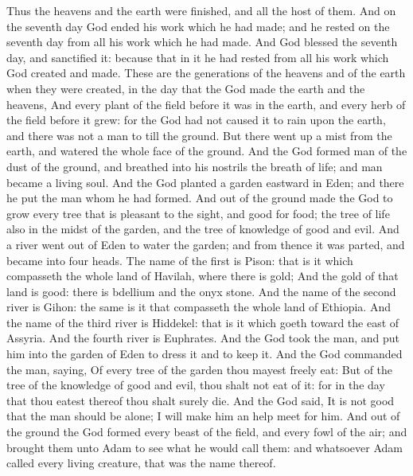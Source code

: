 \begin{biblechapter} %
\verse Thus the heavens and the earth were finished, and all the host of them.
\verse And on the seventh day God ended his work which he had made; and he rested on the seventh day from all his work which he had made.
\verse And God blessed the seventh day, and sanctified it: because that in it he had rested from all his work which God created and made.
 These are the generations of the heavens and of the earth when they were created, in the day that the \LORD God made the earth and the heavens,
\verse And every plant of the field before it was in the earth, and every herb of the field before it grew: for the \LORD God had not caused it to rain upon the earth, and there was not a man to till the ground.
\verse But there went up a mist from the earth, and watered the whole face of the ground.
\verse And the \LORD God formed man of the dust of the ground, and breathed into his nostrils the breath of life; and man became a living soul.
\verse And the \LORD God planted a garden eastward in Eden; and there he put the man whom he had formed.
\verse And out of the ground made the \LORD God to grow every tree that is pleasant to the sight, and good for food; the tree of life also in the midst of the garden, and the tree of knowledge of good and evil.
\verse And a river went out of Eden to water the garden; and from thence it was parted, and became into four heads.
\verse The name of the first is Pison: that is it which compasseth the whole land of Havilah, where there is gold;
\verse And the gold of that land is good: there is bdellium and the onyx stone.
\verse And the name of the second river is Gihon: the same is it that compasseth the whole land of Ethiopia.
\verse And the name of the third river is Hiddekel: that is it which goeth toward the east of Assyria. And the fourth river is Euphrates.
\verse And the \LORD God took the man, and put him into the garden of Eden to dress it and to keep it.
\verse And the \LORD God commanded the man, saying, Of every tree of the garden thou mayest freely eat:
\verse But of the tree of the knowledge of good and evil, thou shalt not eat of it: for in the day that thou eatest thereof thou shalt surely die.
\verse And the \LORD God said, It is not good that the man should be alone; I will make him an help meet for him.
\verse And out of the ground the \LORD God formed every beast of the field, and every fowl of the air; and brought them unto Adam to see what he would call them: and whatsoever Adam called every living creature, that was the name thereof.

\end{biblechapter}
